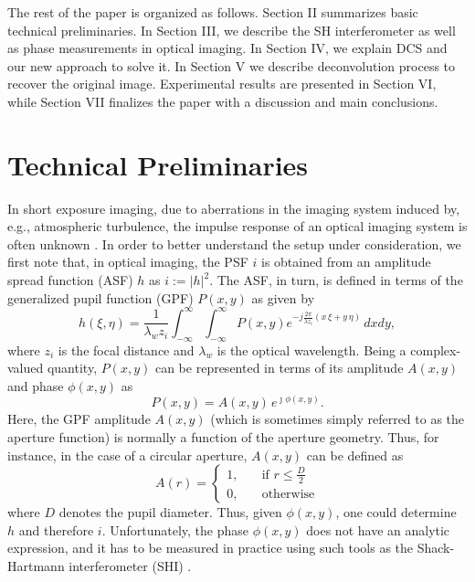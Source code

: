 \pdfoutput=1 \documentclass[journal]{IEEEtran}
\begin{document}
The rest of the paper is organized as follows. Section II summarizes basic technical preliminaries. In Section III, we describe the SH interferometer as well as phase measurements in optical imaging. In Section IV, we explain DCS and our new approach to solve it. In Section V we describe deconvolution process to recover the original image. Experimental results are presented in Section VI, while Section VII finalizes the paper with a discussion and main conclusions.

\section{Technical Preliminaries}
In short exposure imaging, due to aberrations in the imaging system induced by, e.g., atmospheric turbulence, the impulse response of an optical imaging system is often unknown \cite{15}. In order to better understand the setup under consideration, we first note that, in optical imaging, the PSF $i$ is obtained from an amplitude spread function (ASF) $h$ as $i := | h |^2$. The ASF, in turn, is defined in terms of the generalized pupil function (GPF) $P(x,y)$ as given by \cite{17}
\begin{equation} \label{3}
h(\xi,\eta)=\frac{1}{\lambda_w z_i}\int_{-\infty}^{\infty} \int_{-\infty}^{\infty} P(x,y) e^{-j\frac{2\pi}{\lambda z_i}( x \, \xi + y \, \eta)} \, dxdy,
\end{equation}
where $z_i$ is the focal distance and $\lambda_w$ is the optical wavelength. Being a complex-valued quantity, $P(x,y)$ can be represented in terms of its amplitude $A(x,y)$ and phase $\phi(x,y)$ as
\begin{equation} \label{4}
P(x,y) = A(x,y) \, e^{ \jmath \phi(x,y)}.
\end{equation}
Here, the GPF amplitude $A(x,y)$ (which is sometimes simply referred to as the aperture function) is normally a function of the aperture geometry. Thus, for instance, in the case of a circular aperture, $A(x,y)$ can be defined as \cite{15}
\begin{equation} \label{5}
A(r)=
 \begin{cases}
 1, \quad  &\mbox{if } r \le \frac{D}{2} \\
 0, \quad  &\text{otherwise}
 \end{cases}
\end{equation}
where $D$ denotes the pupil diameter. Thus, given $\phi(x,y)$, one could determine $h$ and therefore $i$. Unfortunately, the phase $\phi(x,y)$ does not have an analytic expression, and it has to be measured in practice using such tools as the Shack-Hartmann interferometer (SHI) \cite{12}.
\end{document}
